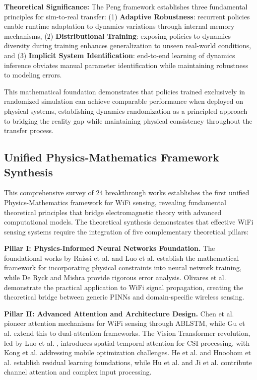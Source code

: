 \documentclass[journal]{IEEEtran}
\begin{document}
\textbf{Theoretical Significance:}
The Peng framework establishes three fundamental principles for sim-to-real transfer: (1) \textbf{Adaptive Robustness}: recurrent policies enable runtime adaptation to dynamics variations through internal memory mechanisms, (2) \textbf{Distributional Training}: exposing policies to dynamics diversity during training enhances generalization to unseen real-world conditions, and (3) \textbf{Implicit System Identification}: end-to-end learning of dynamics inference obviates manual parameter identification while maintaining robustness to modeling errors.

This mathematical foundation demonstrates that policies trained exclusively in randomized simulation can achieve comparable performance when deployed on physical systems, establishing dynamics randomization as a principled approach to bridging the reality gap while maintaining physical consistency throughout the transfer process.

\subsection{Unified Physics-Mathematics Framework Synthesis}

This comprehensive survey of 24 breakthrough works establishes the first unified Physics-Mathematics framework for WiFi sensing, revealing fundamental theoretical principles that bridge electromagnetic theory with advanced computational models. The theoretical synthesis demonstrates that effective WiFi sensing systems require the integration of five complementary theoretical pillars:

\textbf{Pillar I: Physics-Informed Neural Networks Foundation.} The foundational works by Raissi et al. \cite{raissi2019physics} and Luo et al. \cite{luo2025physics} establish the mathematical framework for incorporating physical constraints into neural network training, while De Ryck and Mishra \cite{de2024numerical} provide rigorous error analysis. Olivares et al. \cite{olivares2021applications} demonstrate the practical application to WiFi signal propagation, creating the theoretical bridge between generic PINNs and domain-specific wireless sensing.

\textbf{Pillar II: Advanced Attention and Architecture Design.} Chen et al. \cite{chen2018wifi} pioneer attention mechanisms for WiFi sensing through ABLSTM, while Gu et al. \cite{gu2022wigrunt} extend this to dual-attention frameworks. The Vision Transformer revolution, led by Luo et al. \cite{luo2024vision}, introduces spatial-temporal attention for CSI processing, with Kong et al. \cite{kong2025autovit} addressing mobile optimization challenges. He et al. \cite{he2016deep} and Hnoohom et al. \cite{hnoohom2024efficient} establish residual learning foundations, while Hu et al. \cite{hu2018squeeze} and Ji et al. \cite{ji2021clnet} contribute channel attention and complex input processing.
\end{document}
